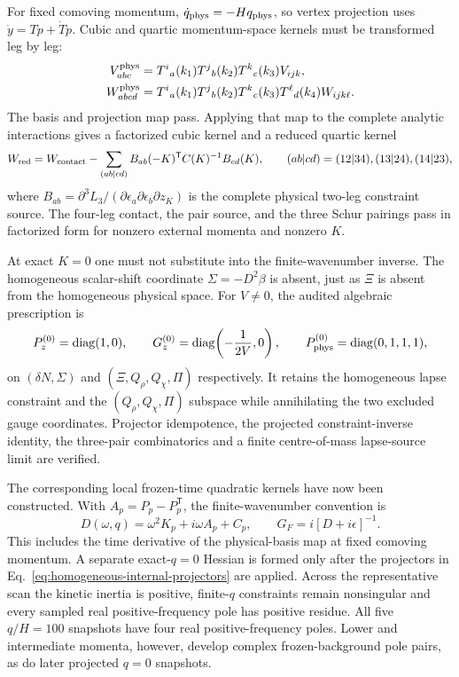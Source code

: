 For fixed comoving momentum, $\dot q_{\rm phys}=-Hq_{\rm phys}$, so vertex
projection uses $\dot y=T\dot p+\dot T p$.  Cubic and quartic momentum-space
kernels must be transformed leg by leg:
\begin{align}
 V^{\rm phys}_{abc}&=
 T^i{}_a(k_1)T^j{}_b(k_2)T^k{}_c(k_3)V_{ijk},\nonumber\\
 W^{\rm phys}_{abcd}&=
 T^i{}_a(k_1)T^j{}_b(k_2)T^k{}_c(k_3)T^\ell{}_d(k_4)W_{ijk\ell}.
 \label{eq:physical-vertex-projection}
\end{align}
The basis and projection map pass.  Applying that map to the complete
analytic interactions gives a factorized cubic kernel and a reduced quartic
kernel
\begin{equation}
 W_{\rm red}=W_{\rm contact}
 -\sum_{(ab|cd)}B_{ab}(-K)^{\mathsf T}C(K)^{-1}B_{cd}(K),
 \qquad (ab|cd)=(12|34),(13|24),(14|23),
 \label{eq:reduced-quartic-momentum-kernel}
\end{equation}
where
$B_{ab}=\partial^3L_3/(\partial\epsilon_a\partial\epsilon_b\partial z_K)$
is the complete physical two-leg constraint source.  The four-leg contact,
the pair source, and the three Schur pairings pass in factorized form for
nonzero external momenta and nonzero $K$.

At exact $K=0$ one must not substitute into the finite-wavenumber inverse.
The homogeneous scalar-shift coordinate $\Sigma=-D^2\beta$ is absent, just as
$\Xi$ is absent from the homogeneous physical space.  For $V\ne0$, the audited algebraic prescription is
\begin{equation}
 P_z^{(0)}=\operatorname{diag}(1,0),\qquad
 G_z^{(0)}=\operatorname{diag}\!\left(-\frac{1}{2V},0\right),\qquad
 P_{\rm phys}^{(0)}=\operatorname{diag}(0,1,1,1),
 \label{eq:homogeneous-internal-projectors}
\end{equation}
on $(\delta N,\Sigma)$ and $(\Xi,Q_\rho,Q_\chi,\Pi)$ respectively.  It
retains the homogeneous lapse constraint and the
$(Q_\rho,Q_\chi,\Pi)$ subspace while annihilating the two excluded gauge
coordinates.  Projector idempotence, the projected constraint-inverse
identity, the three-pair combinatorics and a finite centre-of-mass lapse-source
limit are verified.

The corresponding local frozen-time quadratic kernels have now been
constructed.  With $A_p=P_p-P_p^{\mathsf T}$, the finite-wavenumber convention is
\begin{equation}
 D(\omega,q)=\omega^2K_p+i\omega A_p+C_p,
 \qquad G_F=i[D+i\epsilon]^{-1}.
 \label{eq:physical-quadratic-propagator}
\end{equation}
This includes the time derivative of the physical-basis map at fixed comoving
momentum.  A separate exact-$q=0$ Hessian is formed only after the projectors
in Eq.~\eqref{eq:homogeneous-internal-projectors} are applied.  Across the
representative scan the kinetic inertia is positive, finite-$q$ constraints
remain nonsingular and every sampled real positive-frequency pole has positive
residue.  All five $q/H=100$ snapshots have four real positive-frequency
poles.  Lower and intermediate momenta, however, develop complex
frozen-background pole pairs, as do later projected $q=0$ snapshots.

